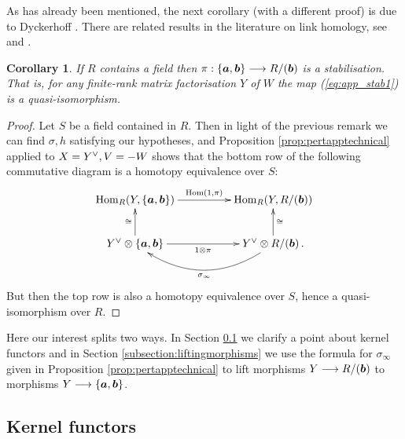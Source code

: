 \documentclass{compositio}
\newtheorem{corollary}[theorem]{Corollary}
\theoremstyle{definition}
\numberwithin{equation}{section}
\def\Hom{\operatorname{Hom}}
\begin{document}
As has already been mentioned, the next corollary (with a different proof) is due to Dyckerhoff \cite{d0904.4713}. There are related results in the literature on link homology, see \cite[Section 3.2]{r0607544} and \cite[Section 1.2]{w0610650}.

\begin{corollary} If $R$ contains a field then $\pi: \{\boldsymbol{a},\boldsymbol{b}\} \longrightarrow R/(\boldsymbol{b})$ is a stabilisation. That is, for any finite-rank matrix factorisation $Y$ of $W$ the map (\ref{eq:app_stab1}) is a quasi-isomorphism.
\end{corollary}
\begin{proof}
Let $S$ be a field contained in $R$. Then in light of the previous remark we can find $\sigma, h$ satisfying our hypotheses, and Proposition \ref{prop:pertapptechnical} applied to $X = Y^{\vee}, V = -W$ shows that the bottom row of the following commutative diagram is a homotopy equivalence over $S$: 
\begin{equation}\label{eq:cons3}
\xymatrix@C+2pc{
\Hom_R(Y, \{\ba, \bb\}) \ar[r]^-{\Hom(1,\pi)} & \Hom_R(Y, R/(\bb))\\
Y^{\lor} \otimes \{ \ba, \bb \} \ar[u]^{\cong} \ar[r]_-{1 \otimes \pi} & Y^{\lor} \otimes R/(\bb) \, . \ar@/^2pc/[l]^-{\sigma_\infty} \ar[u]_{\cong}
}
\end{equation}
But then the top row is also a homotopy equivalence over $S$, hence a quasi-isomorphism over $R$.
\end{proof}

Here our interest splits two ways. In Section \ref{subsection:kernelfunctors} we clarify a point about kernel functors and in Section \ref{subsection:liftingmorphisms} we use the formula for $\sigma_\infty$ given in Proposition \ref{prop:pertapptechnical} to lift morphisms $Y \longrightarrow R/(\boldsymbol{b})$ to morphisms $Y \longrightarrow \{ \boldsymbol{a}, \boldsymbol{b} \}$.

\subsection{Kernel functors}\label{subsection:kernelfunctors}
\end{document}
